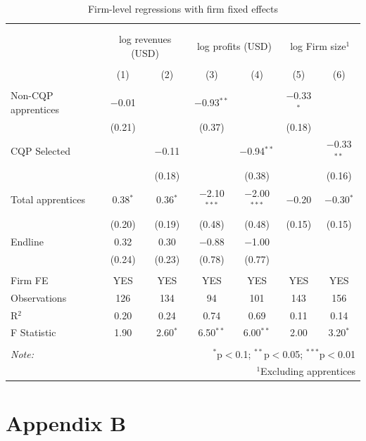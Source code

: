 \documentclass[
  11pt,
a4paper
]{article}
\begin{document}
\begin{landscape}
\end{landscape}

\begin{table}[H] \centering 
  \caption{Firm-level regressions with firm fixed effects} 
  \label{tab:firmregsfe} 
\begin{tabular}{@{\extracolsep{5pt}}lcccccc} 
\\[-1.8ex]\hline 
\hline \\[-1.8ex] 
\\[-1.8ex] & \multicolumn{2}{c}{log revenues (USD)} & \multicolumn{2}{c}{log profits (USD)} & \multicolumn{2}{c}{log Firm size$^1$} \\ 
\\[-1.8ex] & (1) & (2) & (3) & (4) & (5) & (6)\\ 
\hline \\[-1.8ex] 
 Non-CQP apprentices & $-$0.01 &  & $-$0.93$^{**}$ &  & $-$0.33$^{*}$ &  \\ 
  & (0.21) &  & (0.37) &  & (0.18) &  \\ 
  CQP Selected &  & $-$0.11 &  & $-$0.94$^{**}$ &  & $-$0.33$^{**}$ \\ 
  &  & (0.18) &  & (0.38) &  & (0.16) \\ 
  Total apprentices & 0.38$^{*}$ & 0.36$^{*}$ & $-$2.10$^{***}$ & $-$2.00$^{***}$ & $-$0.20 & $-$0.30$^{*}$ \\ 
  & (0.20) & (0.19) & (0.48) & (0.48) & (0.15) & (0.15) \\ 
  Endline & 0.32 & 0.30 & $-$0.88 & $-$1.00 &  &  \\ 
  & (0.24) & (0.23) & (0.78) & (0.77) &  &  \\ 
 \hline \\[-1.8ex] 
Firm FE & YES & YES & YES & YES & YES & YES \\ 
Observations & 126 & 134 & 94 & 101 & 143 & 156 \\ 
R$^{2}$ & 0.20 & 0.24 & 0.74 & 0.69 & 0.11 & 0.14 \\ 
F Statistic & 1.90 & 2.60$^{*}$ & 6.50$^{**}$ & 6.00$^{**}$ & 2.00 & 3.20$^{*}$ \\ 
\hline 
\hline \\[-1.8ex] 
\textit{Note:}  & \multicolumn{6}{r}{$^{*}$p$<$0.1; $^{**}$p$<$0.05; $^{***}$p$<$0.01} \\ 
 & \multicolumn{6}{r}{$^1$Excluding apprentices} \\ 
\end{tabular} 
\end{table}

\hypertarget{appendix-b}{%
\section*{Appendix B}\label{appendix-b}}

\setcounter{figure}{0}
\renewcommand{\thefigure}{B\arabic{section}.\arabic{figure}}
\end{document}
